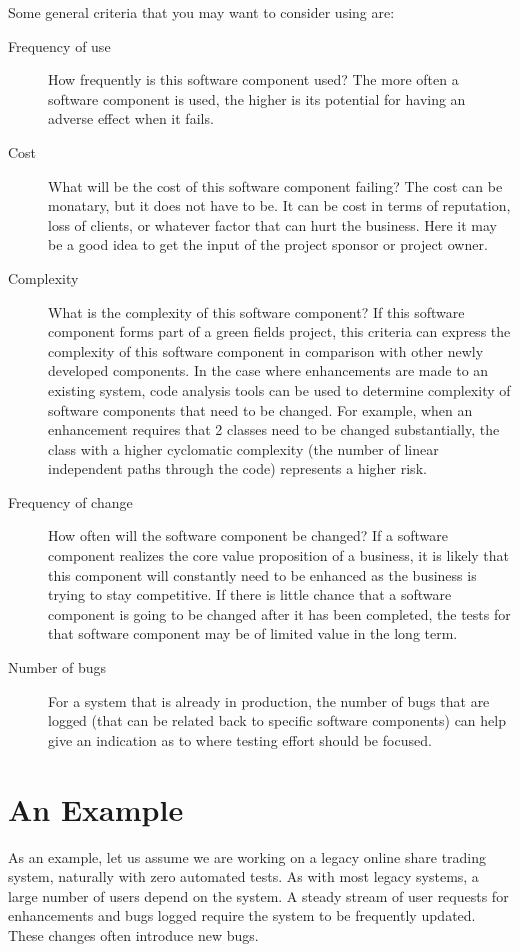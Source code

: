 \documentclass{amsart}
\begin{document}
Some general criteria that you may want to consider using are:
\begin{description}
 \item[Frequency of use] How frequently is this software component used? The more often a software component is used, the higher is its potential for having an adverse effect when it fails. 
 \item[Cost] What will be the cost of this software component failing? The cost can be monatary, but it does not have to be. It can be cost in terms of reputation, loss of clients, or whatever factor that can hurt the business. Here it may be a good idea to get the input of the project sponsor or project owner.
 \item[Complexity] What is the complexity of this software component? If this software component forms part of a green fields project, this criteria can express the complexity of this software component in comparison with other newly developed components. In the case where enhancements are made to an existing system, code analysis tools can be used to determine complexity of software components that need to be changed. For example, when an enhancement requires that 2 classes need to be changed substantially,  the class with a higher cyclomatic complexity (the number of linear independent paths through the code) represents a higher risk.
 \item[Frequency of change] How often will the software component be changed? If a software component realizes the core value proposition of a business, it is likely that this component will constantly need to be enhanced as the business is trying to stay competitive. If there is little chance that a software component is going to be changed after it has been completed, the tests for that software component may be of limited value in the long term. 
 \item[Number of bugs] For a system that is already in production, the number of bugs that are logged (that can be related back to specific software components) can help give an indication as to where testing effort should be focused.
\end{description}


\section{An Example}
As an example, let us assume we are working on a legacy online share trading system, naturally with zero automated tests. As with most legacy systems, a large number of users depend on the system. A steady stream of user requests for enhancements and bugs logged require the system to be frequently updated. These changes often 
introduce new bugs. 
\end{document}
